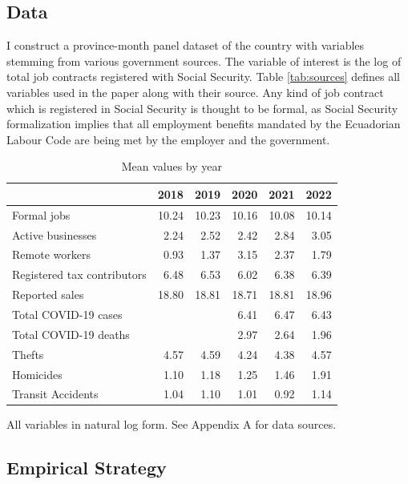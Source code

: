\documentclass[11pt,a4paper]{article}\usepackage[]{graphicx}\usepackage[]{xcolor}
\begin{document}
\subsection{Data}
I construct a province-month panel dataset of the country with variables stemming from various government sources. The variable of interest is the log of total job contracts registered with Social Security. Table \ref{tab:sources} defines all variables used in the paper along with their source. Any kind of job contract which is registered in Social Security is thought to be formal, as Social Security formalization implies that all employment benefits mandated by the Ecuadorian Labour Code are being met by the employer and the government.
\begin{table}[h]
\caption{Mean values by year}
\label{tab:descrip}
\centering

\begin{tabular}[t]{lrrrrr}
\toprule
  & 2018 & 2019 & 2020 & 2021 & 2022\\
\midrule
Formal jobs & \num{10.24} & \num{10.23} & \num{10.16} & \num{10.08} & \num{10.14}\\
Active businesses & \num{2.24} & \num{2.52} & \num{2.42} & \num{2.84} & \num{3.05}\\
Remote workers & \num{0.93} & \num{1.37} & \num{3.15} & \num{2.37} & \num{1.79}\\
Registered tax contributors & \num{6.48} & \num{6.53} & \num{6.02} & \num{6.38} & \num{6.39}\\
Reported sales & \num{18.80} & \num{18.81} & \num{18.71} & \num{18.81} & \num{18.96}\\
Total COVID-19 cases &  &  & \num{6.41} & \num{6.47} & \num{6.43}\\
Total COVID-19 deaths &  &  & \num{2.97} & \num{2.64} & \num{1.96}\\
Thefts & \num{4.57} & \num{4.59} & \num{4.24} & \num{4.38} & \num{4.57}\\
Homicides & \num{1.10} & \num{1.18} & \num{1.25} & \num{1.46} & \num{1.91}\\
Transit Accidents & \num{1.04} & \num{1.10} & \num{1.01} & \num{0.92} & \num{1.14}\\
\bottomrule
\end{tabular}


\vspace{0.3cm}
All variables in natural log form. See Appendix A for data sources.
\end{table}
\subsection{Empirical Strategy}
\end{document}
